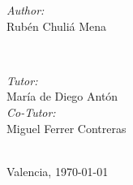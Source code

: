 \begin{titlepage}
\begin{minipage}{0.4\textwidth}
\begin{flushleft} \large
\emph{Author:}\\
Rub\'{e}n Chuli\'{a} Mena %
\end{flushleft}
\end{minipage}
~
\begin{minipage}{0.4\textwidth}
\begin{flushright} \large
\emph{Tutor:} \\
Mar\'ia de Diego Ant\'on\\
\vspace{5mm}
\emph{Co-Tutor:} \\
Miguel Ferrer Contreras\\
\end{flushright}
\end{minipage}\\[2cm]



{\large Valencia, \today}\\[2cm] %



\vfill %

\end{titlepage}